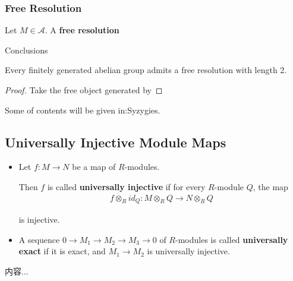 \documentclass[Total.tex]{subfiles}
\begin{document}
					\subsubsection{Free Resolution}
					\begin{Def}
					Let $M\in \mathcal{A}$. A \textbf{free resolution}
					\end{Def}
					Conclusions
					\begin{proposition}
					Every finitely generated abelian group admits a free resolution with length 2.
					\end{proposition}
					\begin{proof}
					Take the free object generated by
					\end{proof}
					Some of contents will be given in:Syzygies.
			\subsection{Universally Injective Module Maps}
				\begin{Def}
					\begin{itemize}
						\item Let $f:M\rightarrow N$ be a map of $R$-modules.
						
						Then $f$ is called \textbf{universally injective} if for every $R$-module $Q$, the map
						\begin{gather*}
							f\otimes_R id_Q:M\otimes_R Q\rightarrow N\otimes_R Q
						\end{gather*}
						
						is injective.
						\item A sequence $0\rightarrow M_1\rightarrow M_2\rightarrow M_3\rightarrow 0$ of $R$-modules is called \textbf{universally exact} if it is exact, and $M_1\rightarrow M_2$ is universally injective.
					\end{itemize}
				\end{Def}
				
				\begin{example}
					内容...
				\end{example}
				
\end{document}
